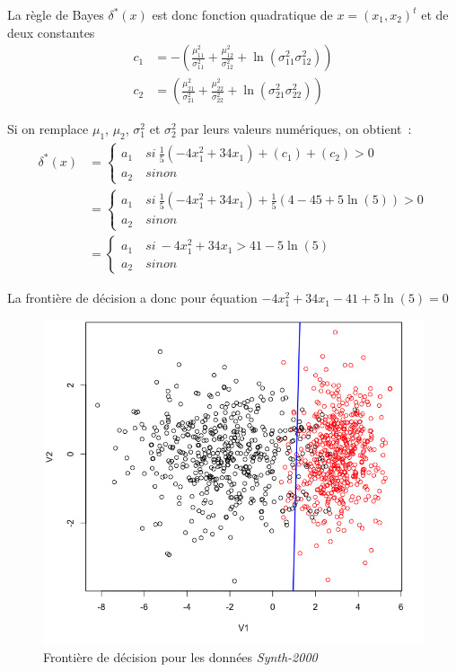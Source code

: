\documentclass[a4paper,10pt]{report}
\begin{document}
La règle de Bayes $\delta^*(x)$ est donc fonction quadratique de $x = (x_1, x_2)^t$ et de deux constantes
\begin{align*}
c_1 &= - \left(  
\frac{\mu_{11}^2}{\sigma_{11}^2} 
+ \frac{\mu_{12}^2}{\sigma_{12}^2} 
+ \ln(\sigma_{11}^2 \sigma_{12}^2)
\right) \\
c_2 &= \left(  
\frac{\mu_{21}^2}{\sigma_{21}^2} 
+ \frac{\mu_{22}^2}{\sigma_{22}^2} 
+ \ln(\sigma_{21}^2 \sigma_{22}^2) 
\right)
\end{align*}


Si on remplace $\mu_{1}$, $\mu_{2}$, $\sigma_{1}^2$ et $\sigma_{2}^2$ par leurs valeurs numériques, on obtient~:
\begin{align*}
\delta^*(x) 
&=  \left\{ 
\begin{array}{l}
a_1 \quad si\ \frac{1}{5}(-4x_1^2 + 34x_1) + \left(c_1\right) + \left(c_2\right) > 0 \\
a_2 \quad sinon
\end{array} 	\right. \\
&=  \left\{ 
\begin{array}{l}
a_1 \quad si\ \frac{1}{5}(-4x_1^2 + 34x_1) + \frac{1}{5} \left( 4 - 45 + 5\ln(5) \right) > 0 \\
a_2 \quad sinon
\end{array} 	\right. \\
&=  \left\{ 
\begin{array}{l}
a_1 \quad si\ -4x_1^2 + 34x_1 > 41 - 5\ln(5) \\
a_2 \quad sinon
\end{array} 	\right.
\end{align*}


La frontière de décision a donc pour équation $-4x_1^2 + 34x_1 -41 + 5\ln(5) = 0$

\begin{figure}[H]
	\centering
	\captionsetup{justification=centering, margin=4cm}
	\includegraphics[width=.5\linewidth]{img/3-2-1-front-dec-euc-Synth2}
	\caption{\small Frontière de décision pour les données \textit{Synth-2000}}	
	\label{fig:3-2-1-front-dec-euc-Synth2}%
\end{figure}
\end{document}
